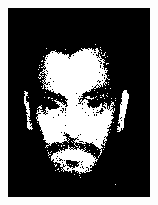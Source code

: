 \begin{figure}[h]
\begin{subfigure}[b]{0.18\textwidth}
         \includegraphics[width=\textwidth]{images/results/base/hh78.color.d3_dyc.png}
     \end{subfigure}
     \begin{subfigure}[b]{0.18\textwidth}
         \centering

\end{subfigure}
\end{figure}

